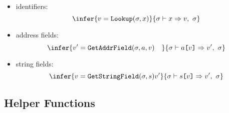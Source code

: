\begin{itemize}
  \item identifiers:
    \[
      \infer
      {
        \hlookup{\st}{\id}{\val}
      }
      {\evalrefv{\st}{\id}{\val}{\st}}
    \]
  \item address fields:
    \[
      \infer
      {
        \hgetaddrfield{\st}{\addr}{\val}{\val'} \quad
      }
      {\evalrefv{\st}{\addr \C{[} \val \C{]}}{\val'}{\st}}
    \]
  \item string fields:
    \[
      \infer
      {
        \hgetstrfield{\st}{\str}{\val}{\val'}
      }
      {\evalrefv{\st}{\str \C{[} \val \C{]}}{\val'}{\st}}
    \]
\end{itemize}

\newpage


\subsection{Helper Functions}\label{sec:helper}

